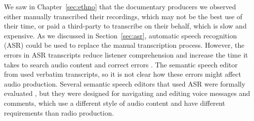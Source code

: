 We saw in Chapter~\ref{sec:ethno} that the documentary producers we observed either manually transcribed their
recordings, which may not be the best use of their time, or paid a third-party to transcribe on their behalf, which is
slow and expensive.  As we discussed in Section~\ref{sec:asr}, automatic speech recognition (ASR) could be used to
replace the manual transcription process. However, the errors in ASR transcripts reduce listener comprehension
\citep{Stark2000,Vemuri2004} and increase the time it takes to search audio content \citep{Ranjan2006} and correct
errors \citep{Burke2006}. The semantic speech editor from \citet{Rubin2013} used verbatim transcripts, so it is not
clear how these errors might affect audio production. Several semantic speech editors that used ASR were formally
evaluated \citep{Whittaker2004,Yoon2014,Sivaraman2016}, but they were designed for navigating and editing voice
messages and comments, which use a different style of audio content and have different requirements than radio
production.








